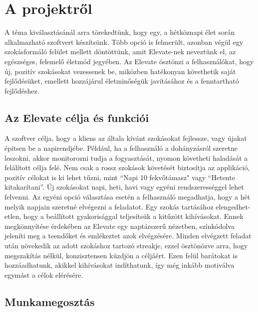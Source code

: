 \documentclass[12pt]{report}
\begin{document}


\setcounter{tocdepth}{2}
\tableofcontents

\chapter{A projektről}
\begin{sloppypar}
A téma kiválasztásánál arra törekedtünk, hogy egy, a hétköznapi élet során alkalmazható szoftvert készítsünk. Több opció is felmerült, azonban végül egy szokásformáló felület mellett döntöttünk, amit Elevate-nek neveztünk el, az egészséges, felemelő életmód jegyében. Az Elevate ösztönzi a felhasználókat, hogy új, pozitív szokásokat vezessenek be, miközben hatékonyan követhetik saját fejlődésüket, emellett hozzájárul életminőségük javításához és a fenntartható fejlődéshez.
\end{sloppypar}
\section{Az Elevate célja és funkciói}
\begin{sloppypar}
A szoftver célja, hogy a kliens az általa kívánt szokásokat fejlessze, vagy újakat építsen be a napirendjébe. Például, ha a felhasználó a dohányzásról szeretne leszokni, akkor monitorozni tudja a fogyasztását, nyomon követheti haladását a felálított célja felé. Nem csak a rossz szokások követését biztosítja az applikáció, pozitív célokat is ki lehet tűzni, mint “Napi 10 fekvőtámasz" vagy “Hetente kitakarítani”. Új szokásokat napi, heti, havi vagy egyéni rendszerességgel lehet felvenni. Az egyéni opció választása esetén a felhasználó megadhatja, hogy a hét melyik napjain szeretné elvégezni a feladatot. Egy szokás tartásához elengedhet-etlen, hogy a beállított gyakorisággal teljesítsük a kitűzött kihívásokat. Ennek megkönnyítése érdekében az Elevate egy naptárszerű nézetben, színkódolva jeleníti meg a teendőket és emlékeztet azok elvégzésére. Minden elvégzett feladat után növekedik az adott szokáshoz tartozó streakje, ezzel ösztönözve arra, hogy megszakítás nélkül, konzisztensen küzdjön a céljáért. Ezen felül barátokat is hozzáadhatunk, akikkel kihívásokat indíthatunk, így még inkább motiválva egymást a célok elérésére.
\end{sloppypar}
\section{Munkamegosztás}
\end{document}

